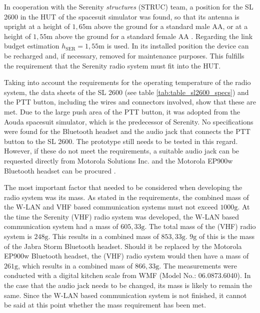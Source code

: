 In cooperation with the Serenity \emph{structures} (STRUC) team, a position for the SL 2600 in the HUT of the spacesuit simulator was found, so that its antenna is upright at a height of $1,65\mathrm{m}$ above the ground for a standard male AA, or at a height of $1,55\mathrm{m}$ above the ground for a standard female AA \cite{Hinker:2007}. Regarding the link budget estimation $h_\mathrm{SER} = 1,55\mathrm{m}$ is used. In its installed position the device can be recharged and, if necessary, removed for maintenance purposes. This fulfills the requirement that the Serenity radio system must fit into the HUT. 

Taking into account the requirements for the operating temperature of the radio system, the data sheets of the SL 2600 (see table \ref{tab:table_sl2600_specs}) and the PTT button, including the wires and connectors involved, show that these are met. Due to the large push area of the PTT button, it was adopted from the Aouda spacesuit simulator, which is the predecessor of Serenity. No specifications were found for the Bluetooth headset and the audio jack that connects the PTT button to the SL 2600. The prototype still needs to be tested in this regard. However, if these do not meet the requirements, a suitable audio jack can be requested directly from Motorola Solutions Inc. and the Motorola EP900w Bluetooth headset can be procured \cite{push_switch:2011, EP900w:2021}.

The most important factor that needed to be considered when developing the radio system was its mass. As stated in the requirements, the combined mass of the W-LAN and VHF based communication systems must not exceed $1000\mathrm{g}$. At the time the Serenity (VHF) radio system was developed, the W-LAN based communication system had a mass of $605,33\mathrm{g}$. The total mass of the (VHF) radio system is $248\mathrm{g}$. This results in a combined mass of $853,33\mathrm{g}$. $9\mathrm{g}$ of this is the mass of the Jabra Storm Bluetooth headset. Should it be replaced by the Motorola EP900w Bluetooth headset, the (VHF) radio system would then have a mass of $261\mathrm{g}$, which results in a combined mass of $866,33\mathrm{g}$. The measurements were conducted with a digital kitchen scale from WMF (Model No.: 06.0873.6040). In the case that the audio jack needs to be changed, its mass is likely to remain the same. Since the W-LAN based communication system is not finished, it cannot be said at this point whether the mass requirement has
 been met. 

